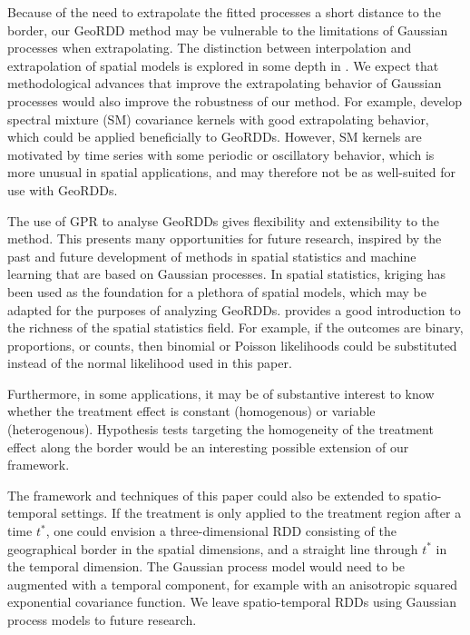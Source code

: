 Because of the need to extrapolate the fitted processes a short distance to the border, our GeoRDD method may be vulnerable to the limitations of Gaussian processes when extrapolating.
The distinction between interpolation and extrapolation of spatial models is explored in some depth in \cite{stein2012interpolation}.
We expect that methodological advances that improve the extrapolating behavior of Gaussian processes would also improve the robustness of our method.
For example, \cite{wilson2013gaussian} develop spectral mixture (SM) covariance kernels with good extrapolating behavior, which could be applied beneficially to GeoRDDs.
However, SM kernels are motivated by time series with some periodic or oscillatory behavior, which is more unusual in spatial applications, and may therefore not be as well-suited for use with GeoRDDs.

The use of GPR to analyse GeoRDDs gives flexibility and extensibility to the method.
This presents many opportunities for future research, inspired by the past and future development of methods in spatial statistics and machine learning that are based on Gaussian processes.
In spatial statistics, kriging has been used as the foundation for a plethora of spatial models, which may be adapted for the purposes of analyzing GeoRDDs.
\cite{banerjee2014hierarchical} provides a good introduction to the richness of the spatial statistics field.
For example, if the outcomes are binary, proportions, or counts, then binomial or Poisson likelihoods could be substituted instead of the normal likelihood used in this paper.

Furthermore, in some applications, it may be of substantive interest to know whether the treatment effect is constant (homogenous) or variable (heterogenous).
Hypothesis tests targeting the homogeneity of the treatment effect along the border would be an interesting possible extension of our framework.

The framework and techniques of this paper could also be extended to spatio-temporal settings.
If the treatment is only applied to the treatment region after a time \(t^*\), one could envision a three-dimensional RDD consisting of the geographical border in the spatial dimensions, and a straight line through \(t^*\) in the temporal dimension.
The Gaussian process model would need to be augmented with a temporal component, for example with an anisotropic squared exponential covariance function.
We leave spatio-temporal RDDs using Gaussian process models to future research.


